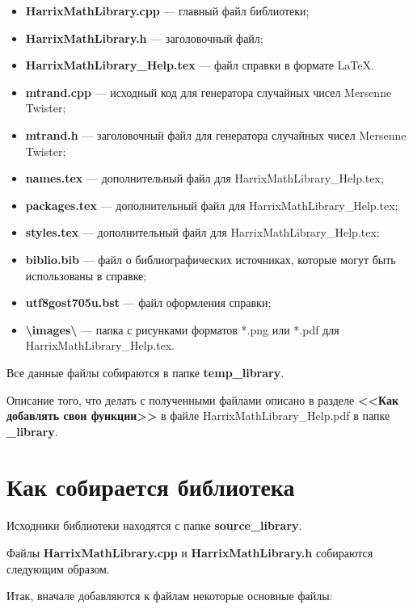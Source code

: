 \documentclass[a4paper,12pt]{article}
\begin{document}
\begin{itemize}
\item \textbf{HarrixMathLibrary.cpp} --- главный файл библиотеки;
\item \textbf{HarrixMathLibrary.h} --- заголовочный файл;\\
\item \textbf{HarrixMathLibrary\_Help.tex} --- файл справки в формате \LaTeX.
\item \textbf{mtrand.cpp} --- исходный код для генератора случайных чисел Mersenne Twister;
\item \textbf{mtrand.h} --- заголовочный файл для генератора случайных чисел Mersenne Twister;
\item \textbf{names.tex} --- дополнительный файл для HarrixMathLibrary\_Help.tex;
\item \textbf{packages.tex} --- дополнительный файл для HarrixMathLibrary\_Help.tex;
\item \textbf{styles.tex} --- дополнительный файл для HarrixMathLibrary\_Help.tex;
\item \textbf{biblio.bib} --- файл о библиографических источниках, которые могут быть использованы в справке;
\item \textbf{utf8gost705u.bst} --- файл оформления справки;
\item \textbf{\textbackslash images\textbackslash} --- папка с рисунками форматов *.png или *.pdf для HarrixMathLibrary\_Help.tex.
\end{itemize}

Все данные файлы собираются в папке \textbf{temp\_library}.

Описание того, что делать с полученными файлами описано в разделе \textbf{<<Как добавлять свои функции>>} в файле HarrixMathLibrary\_Help.pdf в папке \textbf{\_library}.

\section{Как собирается библиотека}
Исходники библиотеки находятся с папке \textbf{source\_library}.

Файлы \textbf{HarrixMathLibrary.cpp} и \textbf{HarrixMathLibrary.h} собираются следующим образом.

Итак, вначале добавляются к файлам некоторые основные файлы:
\end{document}
